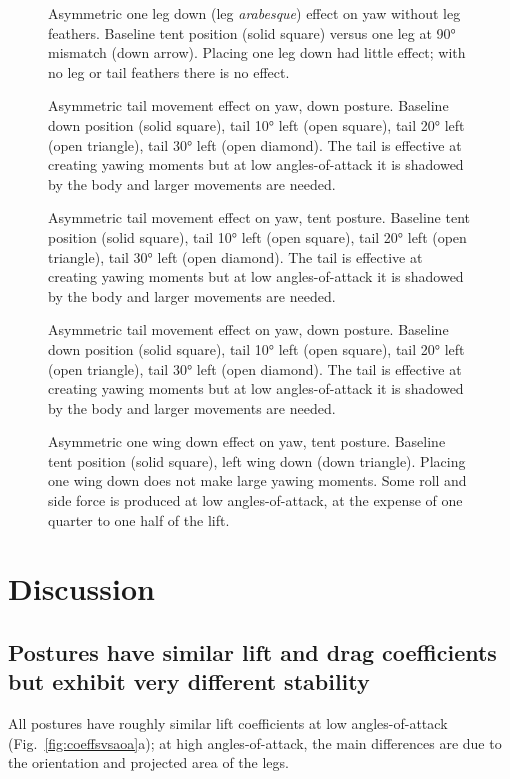 \begin{figure}
\caption{Asymmetric one leg down (leg \emph{arabesque}) effect on yaw without leg feathers.  Baseline tent position (solid square) versus one leg at \ang{90} mismatch (down arrow).  Placing one leg down had little effect; with no leg or tail feathers there is no effect.}
\end{figure}
\begin{figure}
\caption{Asymmetric tail movement effect on yaw, down posture.  Baseline down position (solid square), tail \ang{10} left (open square), tail \ang{20} left (open triangle), tail \ang{30} left (open diamond). The tail is effective at creating yawing moments but at low angles-of-attack it is shadowed by the body and larger movements are needed.}
\end{figure}
\begin{figure}
\caption{Asymmetric tail movement effect on yaw, tent posture.  Baseline tent position (solid square), tail \ang{10} left (open square), tail \ang{20} left (open triangle), tail \ang{30} left (open diamond). The tail is effective at creating yawing moments but at low angles-of-attack it is shadowed by the body and larger movements are needed.}
\end{figure}
\begin{figure}
\caption{Asymmetric tail movement effect on yaw, down posture.  Baseline down position (solid square), tail \ang{10} left (open square), tail \ang{20} left (open triangle), tail \ang{30} left (open diamond). The tail is effective at creating yawing moments but at low angles-of-attack it is shadowed by the body and larger movements are needed.}
\end{figure}
\begin{figure}
\caption{Asymmetric one wing down effect on yaw, tent posture.  Baseline tent position (solid square), left wing down (down triangle). Placing one wing down does not make large yawing moments.  Some roll and side force is produced at low angles-of-attack, at the expense of one quarter to one half of the lift.}
\end{figure}







\section{Discussion}

\subsection{Postures have similar lift and drag coefficients but exhibit very different stability}
All postures have roughly similar lift coefficients at low angles-of-attack (Fig.~\ref{fig:coeffsvsaoa}a); at high angles-of-attack, the main differences are due to the orientation and projected area of the legs.  

